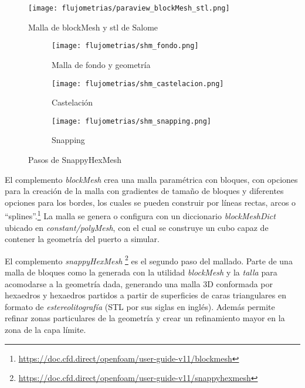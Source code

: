 \begin{figure}
    \centering
    \texttt{[image: flujometrias/paraview\_blockMesh\_stl.png]}
    \caption{Malla de blockMesh y stl de Salome}\label{fig:paraview_blockMesh_stl}
\end{figure}

\begin{figure}[t!]
    \centering
    \begin{subfigure}[t]{0.5\textwidth}
        \centering
        \texttt{[image: flujometrias/shm\_fondo.png]}
        \caption{Malla de fondo y geometría}
    \end{subfigure}%
    \begin{subfigure}[t]{0.5\textwidth}
        \centering
        \texttt{[image: flujometrias/shm\_castelacion.png]}
        \caption{Castelación}
    \end{subfigure}
    \begin{subfigure}[t]{0.5\textwidth}
        \centering
        \texttt{[image: flujometrias/shm\_snapping.png]}
        \caption{Snapping}
    \end{subfigure}
    \caption{Pasos de SnappyHexMesh\parencite{shm_steps}}\label{fig:openfoam_shm_pasos}
\end{figure}

El complemento \emph{blockMesh} crea una malla paramétrica con bloques, con
opciones para la creación de la malla con gradientes de tamaño de bloques y
diferentes opciones para los bordes, los cuales se pueden construir por líneas
rectas, arcos o
``splines''.\footnote{\url{https://doc.cfd.direct/openfoam/user-guide-v11/blockmesh}}
%
La malla se genera o configura con un diccionario \emph{blockMeshDict} ubicado
en \emph{constant/polyMesh}, con el cual se construye un cubo capaz de contener
la geometría del puerto a simular.

El complemento \emph{snappyHexMesh}
\footnote{\url{https://doc.cfd.direct/openfoam/user-guide-v11/snappyhexmesh}} es
el segundo paso del mallado.
%
Parte de una malla de bloques como la generada con la utilidad \emph{blockMesh}
y la \emph{talla} para acomodarse a la geometría dada, generando una malla 3D
conformada por hexaedros y hexaedros partidos a partir de superficies de caras
triangulares en formato de \emph{estereolitografía} (STL por sus siglas en
inglés).
%
Además permite refinar zonas particulares de la geometría y crear un
refinamiento mayor en la zona de la capa límite.











